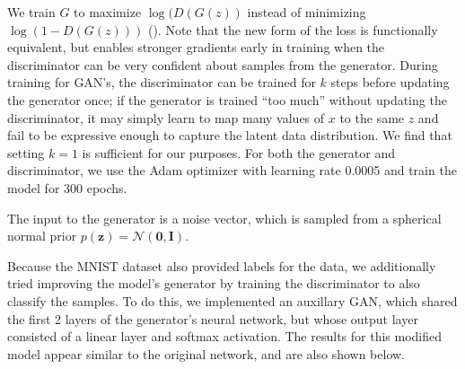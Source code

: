 \documentclass[11pt]{article}
\begin{document}
We train $G$ to maximize $\log(D(G(z))$ instead of minimizing $\log(1-D(G(z)))$ (\cite{gan}). Note that the new form of the loss is functionally equivalent, but enables stronger gradients early in training when the discriminator can be very confident about samples from the generator. During training for GAN's, the discriminator can be trained for $k$ steps before updating the generator once; if the generator is trained ``too much'' without updating the discriminator, it may simply learn to map many values of $x$ to the same $z$ and fail to be expressive enough to capture the latent data distribution. We find that setting $k=1$ is sufficient for our purposes. For both the generator and discriminator, we use the Adam optimizer with learning rate 0.0005 and train the model for 300 epochs.

The input to the generator is a noise vector, which is sampled from a spherical normal prior $p(\mathbf{z}) = \mathcal{N}(\mathbf{0}, \mathbf{I})$.

Because the MNIST dataset also provided labels for the data, we additionally tried improving the model's generator by training the discriminator to also classify the samples. To do this, we implemented an auxillary GAN, which shared the first 2 layers of the generator's neural network, but whose output layer consisted of a linear layer and softmax activation. The results for this modified model appear similar to the original network, and are also shown below.
\end{document}
